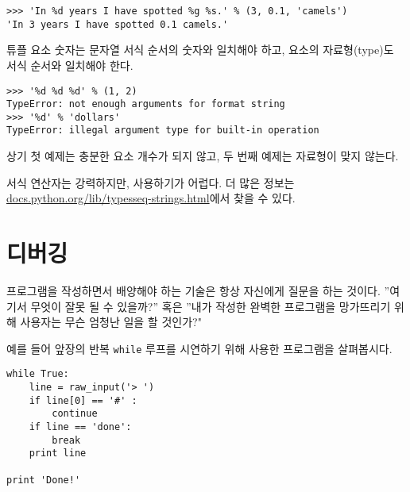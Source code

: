 \beforeverb
\begin{verbatim}
>>> 'In %d years I have spotted %g %s.' % (3, 0.1, 'camels')
'In 3 years I have spotted 0.1 camels.'
\end{verbatim}
\afterverb
%

튜플 요소 숫자는 문자열 서식 순서의 숫자와 일치해야 하고, 요소의 자료형(type)도 서식 순서와 일치해야 한다.


\beforeverb
\begin{verbatim}
>>> '%d %d %d' % (1, 2)
TypeError: not enough arguments for format string
>>> '%d' % 'dollars'
TypeError: illegal argument type for built-in operation
\end{verbatim}
\afterverb
%

상기 첫 예제는 충분한 요소 개수가 되지 않고, 두 번째 예제는 자료형이 맞지 않는다.

서식 연산자는 강력하지만, 사용하기가 어럽다.
더 많은 정보는 \url{docs.python.org/lib/typesseq-strings.html}에서 찾을 수 있다.




\section{    디버깅}

프로그램을 작성하면서 배양해야 하는 기술은 항상 자신에게 질문을 하는 것이다.
''여기서 무엇이 잘못 될 수 있을까?'' 혹은 ''내가 작성한 완벽한 프로그램을 망가뜨리기 위해 사용자는 무슨 엄청난 일을 할 것인가?"

예를 들어 앞장의 반복 {\tt while} 루프를 시연하기 위해 사용한 프로그램을 살펴봅시다.

\beforeverb
\begin{verbatim}
while True:
    line = raw_input('> ')
    if line[0] == '#' :
        continue
    if line == 'done':
        break
    print line

print 'Done!'
\end{verbatim}
\afterverb
%

